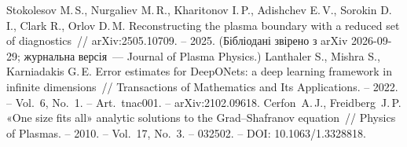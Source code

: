  Stokolesov M.\,S., Nurgaliev M.\,R., Kharitonov I.\,P., Adishchev E.\,V.,
  Sorokin D.\,I., Clark R., Orlov D.\,M. Reconstructing the plasma boundary with a reduced set of
  diagnostics~// arXiv:2505.10709. -- 2025. (Бібліодані звірено з arXiv 2026-09-29; журнальна версія~---
  Journal of Plasma Physics.)
 Lanthaler S., Mishra S., Karniadakis G.\,E. Error estimates for
  DeepONets: a deep learning framework in infinite dimensions~// Transactions of Mathematics
  and Its Applications. -- 2022. -- Vol.~6, No.~1. -- Art.~tnac001. -- arXiv:2102.09618.
 Cerfon~A.\,J., Freidberg~J.\,P. «One size fits all» analytic solutions to the Grad--Shafranov
  equation~// Physics of Plasmas. -- 2010. -- Vol.~17, No.~3. -- 032502. -- DOI: 10.1063/1.3328818.
